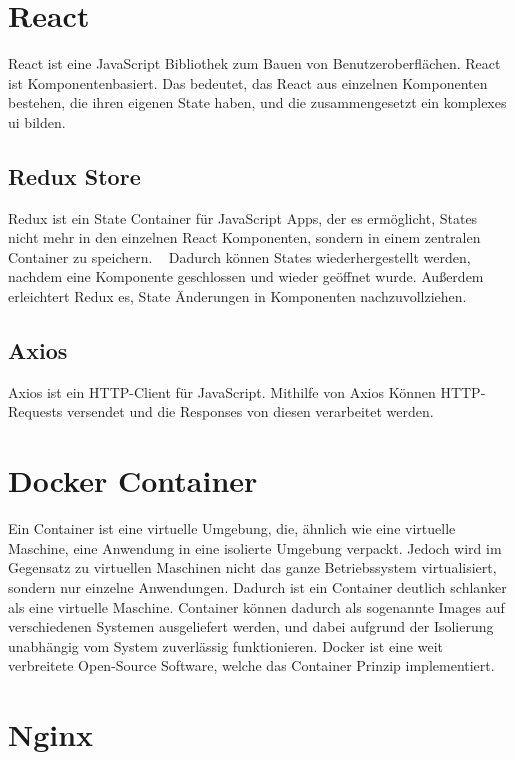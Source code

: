 \section{React}
\label{sec:react}

React ist eine JavaScript Bibliothek zum Bauen von Benutzeroberflächen.
React ist Komponentenbasiert.
Das bedeutet, das React aus einzelnen Komponenten bestehen, die ihren eigenen State haben, und die zusammengesetzt ein komplexes \ac{ui} bilden.
~\autocite{banks:react}


\subsection{Redux Store}
\label{sub:redux}

Redux ist ein State Container für JavaScript Apps, der es ermöglicht, States nicht mehr in den einzelnen React Komponenten, sondern in einem zentralen Container zu speichern.
~\autocite{freecodecamp:redux}
Dadurch können States wiederhergestellt werden, nachdem eine Komponente geschlossen und wieder geöffnet wurde.
Außerdem erleichtert Redux es, State Änderungen in Komponenten nachzuvollziehen.

\subsection{Axios}
\label{sub:axios}

Axios ist ein HTTP-Client für JavaScript.
Mithilfe von Axios Können HTTP-Requests versendet und die Responses von diesen verarbeitet werden.

\section{Docker Container}
\label{sec:docker}

Ein Container ist eine virtuelle Umgebung, die, ähnlich wie eine virtuelle Maschine, eine Anwendung in eine isolierte Umgebung verpackt.
Jedoch wird im Gegensatz zu virtuellen Maschinen nicht das ganze Betriebssystem virtualisiert, sondern nur einzelne Anwendungen.
Dadurch ist ein Container deutlich schlanker als eine virtuelle Maschine.
Container können dadurch als sogenannte Images auf verschiedenen Systemen ausgeliefert werden, und dabei aufgrund der Isolierung unabhängig vom System zuverlässig funktionieren.
Docker ist eine weit verbreitete Open-Source Software, welche das Container Prinzip implementiert.
~\autocite{devInsider:container}

\section{Nginx}
\label{sec:nginx}

